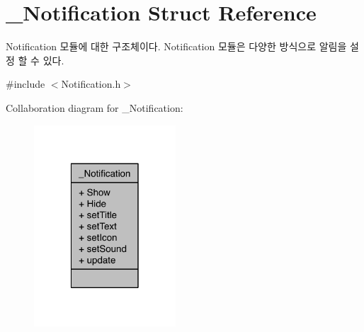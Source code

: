 \hypertarget{struct__Notification}{\section{\-\_\-\-Notification Struct Reference}
\label{struct__Notification}
}


Notification 모듈에 대한 구조체이다. Notification 모듈은 다양한 방식으로 알림을 설정 할 수 있다.  




{\ttfamily \#include $<$Notification.\-h$>$}



Collaboration diagram for \-\_\-\-Notification\-:\nopagebreak
\begin{figure}[H]
\begin{center}
\leavevmode
\includegraphics[width=150pt]{d6/db9/struct__Notification__coll__graph}
\end{center}
\end{figure}
